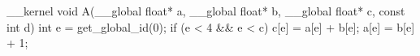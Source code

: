 __kernel void A(__global float* a,
__global float* b,
__global float* c,
const int d) {
int e = get_global_id(0);
if (e < 4 && e < c) {
c[e] = a[e] + b[e];
a[e] = b[e] + 1;
}
}
